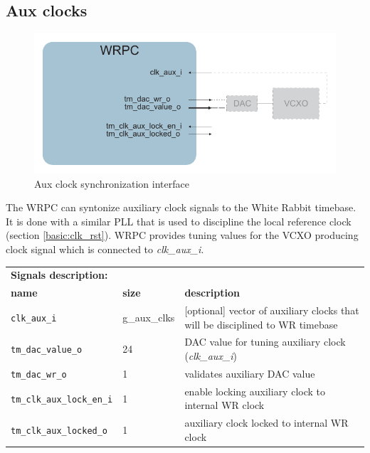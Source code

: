 \subsection{Aux clocks}

\begin{figure}[ht]
  \begin{center}
    \includegraphics[width=.8\textwidth]{fig/adv_wrpc_clk.pdf}
    \caption{Aux clock synchronization interface}
  \end{center}
\end{figure}

The WRPC can syntonize auxiliary clock signals to the White Rabbit timebase. It
is done with a similar PLL that is used to discipline the local reference clock
(section \ref{basic:clk_rst}). WRPC provides tuning values for the VCXO producing
clock signal which is connected to \emph{clk\_aux\_i}.

\begin{center}
  \begin{tabular}{|l|l|p{9cm}|}
    \hline
    \multicolumn{3}{|l|}{\bf Signals description:}\\
    {\bf name} & {\bf size} & {\bf description} \\
    \hline \hline
    \texttt{clk\_aux\_i} & g\_aux\_clks & [optional] vector of auxiliary
    clocks that will be disciplined to WR timebase\\
    \hline
    \texttt{tm\_dac\_value\_o} & 24 & DAC value for tuning auxiliary clock
    (\emph{clk\_aux\_i})\\
    \texttt{tm\_dac\_wr\_o} & 1 & validates auxiliary DAC value\\
    \texttt{tm\_clk\_aux\_lock\_en\_i} & 1 & enable locking auxiliary clock to
    internal WR clock\\
    \texttt{tm\_clk\_aux\_locked\_o} & 1 & auxiliary clock locked to internal WR
    clock\\
    \hline
  \end{tabular}
\end{center}
